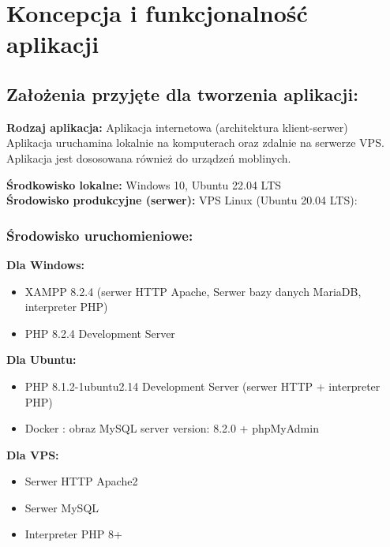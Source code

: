 \section{Koncepcja i funkcjonalność aplikacji}

\subsection{Założenia przyjęte dla tworzenia aplikacji:}
    \begin{flushleft}

        \textbf{Rodzaj aplikacja:} Aplikacja internetowa (architektura klient-serwer) \\

        Aplikacja uruchamina lokalnie na komputerach oraz zdalnie na serwerze VPS. \\
        Aplikacja jest dososowana również do urządzeń moblinych. \newline\newline

        \textbf{Środkowisko lokalne:} Windows 10, Ubuntu 22.04 LTS \\
        \textbf{Środowisko produkcyjne (serwer):} VPS Linux (Ubuntu 20.04 LTS): \\ 

        \subsubsection{Środowisko uruchomieniowe:}

        \textbf{Dla Windows:}
        \begin{itemize}
            \item XAMPP 8.2.4 (serwer HTTP Apache, Serwer bazy danych MariaDB, interpreter PHP)
            \item PHP 8.2.4 Development Server
        \end{itemize}
            
        \textbf{Dla Ubuntu:}
        \begin{itemize}
            \item PHP 8.1.2-1ubuntu2.14 Development Server (serwer HTTP + interpreter PHP)
            \item Docker : obraz MySQL server version: 8.2.0 + phpMyAdmin
        \end{itemize}

        \textbf{Dla VPS:}
        \begin{itemize}
            \item Serwer HTTP Apache2
            \item Serwer MySQL
            \item Interpreter PHP 8+
        \end{itemize}
        
    \end{flushleft}

